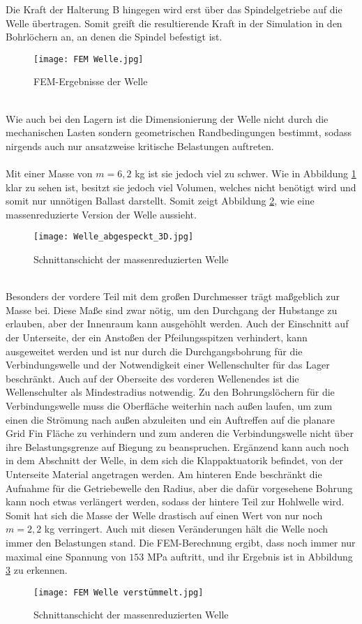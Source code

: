 Die Kraft der Halterung B hingegen wird erst über das Spindelgetriebe auf die Welle übertragen. Somit greift die resultierende Kraft in der Simulation in den Bohrlöchern an, an denen die Spindel befestigt ist.
\begin{figure}[h] 
	\centering
	\texttt{[image: FEM Welle.jpg]}
	\caption{FEM-Ergebnisse der Welle}
	\label{abb_Well_FEM}
\end{figure}\\
Wie auch bei den Lagern ist die Dimensionierung der Welle nicht durch die mechanischen Lasten sondern geometrischen Randbedingungen bestimmt, sodass nirgends auch nur ansatzweise kritische Belastungen auftreten.
\\~\\
Mit einer Masse von $m=6,2$ kg ist sie jedoch viel zu schwer. Wie in Abbildung \ref{abb_Well_FEM} klar zu sehen ist, besitzt sie jedoch viel Volumen, welches nicht benötigt wird und somit nur unnötigen Ballast darstellt. Somit zeigt Abbildung \ref{abb_abgespeckt}, wie eine massenreduzierte Version der Welle aussieht.
\begin{figure}[h] 
	\centering
	\texttt{[image: Welle\_abgespeckt\_3D.jpg]}
	\caption{Schnittanschicht der massenreduzierten Welle}
	\label{abb_abgespeckt}
\end{figure}\\ Besonders der vordere Teil mit dem großen Durchmesser trägt maßgeblich zur Masse bei. Diese Maße sind zwar nötig, um den Durchgang der Hubstange zu erlauben, aber der Innenraum kann ausgehöhlt werden. Auch der Einschnitt auf der Unterseite, der ein Anstoßen der Pfeilungsspitzen verhindert, kann ausgeweitet werden und ist nur durch die Durchgangsbohrung für die Verbindungswelle und der Notwendigkeit einer Wellenschulter für das Lager beschränkt. Auch auf der Oberseite des vorderen Wellenendes ist die Wellenschulter als Mindestradius notwendig. Zu den Bohrungslöchern für die Verbindungswelle muss die Oberfläche weiterhin nach außen laufen, um zum einen die Strömung nach außen abzuleiten und ein Auftreffen auf die planare Grid Fin Fläche zu verhindern und zum anderen die Verbindungswelle nicht über ihre Belastungsgrenze auf Biegung zu beanspruchen. Ergänzend kann auch noch in dem Abschnitt der Welle, in dem sich die Klappaktuatorik befindet, von der Unterseite Material angetragen werden. Am hinteren Ende beschränkt die Aufnahme für die Getriebewelle den Radius, aber die dafür vorgesehene Bohrung kann noch etwas verlängert werden, sodass der hintere Teil zur Hohlwelle wird. Somit hat sich die Masse der Welle drastisch auf einen Wert von nur noch $m= 2,2$ kg verringert. Auch mit diesen Veränderungen hält die Welle noch immer den Belastungen stand. Die FEM-Berechnung ergibt, dass noch immer nur maximal eine Spannung von $153$ MPa auftritt, und ihr Ergebnis ist in Abbildung \ref{abb_abgespecktFEM} zu erkennen.
\begin{figure}[h] 
\centering
\texttt{[image: FEM Welle verstümmelt.jpg]}
\caption{Schnittanschicht der massenreduzierten Welle}
\label{abb_abgespecktFEM}
\end{figure}
